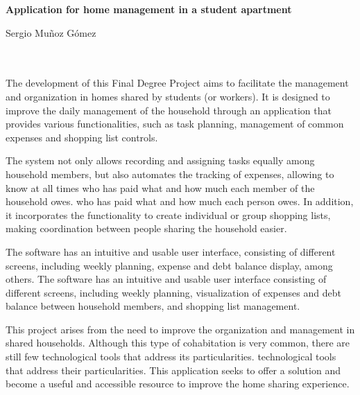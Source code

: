 \cleardoublepage


\thispagestyle{empty}


\begin{center}
{\large\bfseries Application for home management in a student apartment}\\
\end{center}
\begin{center}
Sergio Muñoz Gómez\\
\end{center}

\\

\vspace{0.7cm}
\\

The development of this Final Degree Project aims to facilitate the management and organization in homes shared by students (or workers). 
It is designed to improve the daily management of the household through an application that provides various functionalities, such as task planning, management of common expenses and shopping list controls.


The system not only allows recording and assigning tasks equally among household members, but also automates the tracking of expenses, allowing to know at all times who has paid what and how much each member of the household owes. 
who has paid what and how much each person owes. In addition, it incorporates the functionality to create individual or group shopping lists, making coordination between people sharing the household easier.


The software has an intuitive and usable user interface, consisting of different screens, including weekly planning, expense and debt balance display, among others. 
The software has an intuitive and usable user interface consisting of different screens, including weekly planning, visualization of expenses and debt balance between household members, and shopping list management.

This project arises from the need to improve the organization and management in shared households. Although this type of cohabitation is very common, there are still few technological tools that address its particularities. 
technological tools that address their particularities. This application seeks to offer a solution and become a useful and accessible resource to improve the home sharing experience. 

